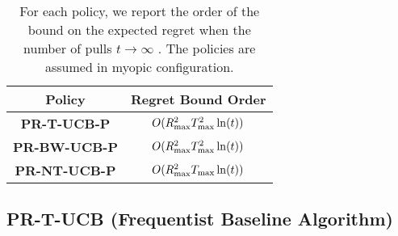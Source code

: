 \begin{table}[H]
	\caption{For each policy, we report the order of the bound on the expected regret when the number of pulls $t \rightarrow \infty$ . The policies are assumed in myopic configuration.}
	\centering
	\begin{tabular}{|c|c|}
		\hline
		\textbf{Policy}      & \textbf{Regret Bound Order} \\ \hline
		\textbf{PR-T-UCB-P}  & $O(R_{\textnormal{max}}^2T_{\textnormal{max}}^2\ln(t))$          \\
		\textbf{PR-BW-UCB-P} & $O(R_{\textnormal{max}}^2T_{\textnormal{max}}^2\ln(t))$          \\
		\textbf{PR-NT-UCB-P} & $O(R_{\textnormal{max}}^2T_{\textnormal{max}}\ln(t))$            \\ \hline
	\end{tabular}
	\label{t:garanzie}
\end{table}





\subsection{PR-T-UCB (Frequentist Baseline Algorithm)}

